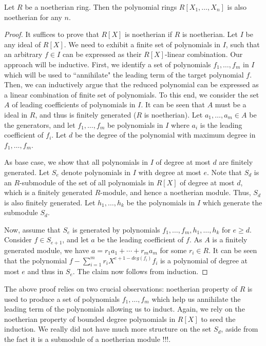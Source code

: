 \documentclass[11pt]{article}
\begin{document}
\begin{theorem}\label{thm:hilbert-basis-theorem}
Let $R$ be a noetherian ring. Then the polynomial rings $R[X_1,\ldots,X_n]$ is also noetherian for any $n$.
\end{theorem}
\begin{proof}
It suffices to prove that $R[X]$ is noetherian if $R$ is noetherian. Let $I$ be any ideal of $R[X]$. We need to
exhibit a finite set of polynomials in $I$, such that an arbitrary $f\in I$ can be expressed as their $R[X]$-linear
combination. Our approach will be inductive. First, we identify a set of polynomials $f_1,\ldots,f_m$ in $I$
which will be used to ``annihilate" the leading term of the target polynomial $f$. Then, we can inductively argue
that the reduced polynomial can be expressed as a linear combination of finite set of polynomials. To this end,
we consider the set $A$ of leading coefficients of polynomials in $I$. It can be seen that $A$ must be a ideal
in $R$, and thus is finitely generated ($R$ is noetherian). Let $a_1,\ldots,a_m\in A$ be the generators, and
let $f_1,\ldots,f_m$ be polynomials in $I$ where $a_i$ is the leading coefficient of $f_i$. Let $d$ be the
degree of the polynomial with maximum degree in $f_1,\ldots,f_m$.

As base case, we show that all polynomials in $I$ of degree at most $d$ are finitely generated. Let $S_e$ denote
polynomials in $I$ with degree at most $e$. Note that $S_d$ is an $R$-submodule of the set of all polynomials
in $R[X]$ of degree at most $d$, which is a finitely generated $R$-module, and hence a noetherian module. Thus,
$S_d$ is also finitely generated. Let $h_1,\ldots,h_k$ be the polynomials in $I$ which generate the submodule
$S_d$.

Now, assume that $S_e$ is generated by polynomials $f_1,\ldots,f_m,h_1,\ldots,h_k$ for $e\geq d$. Consider
$f\in S_{e+1}$, and let $a$ be the leading coefficient of $f$. As $A$ is a finitely generated module, we
have $a=r_1 a_1 + \cdots + r_m a_m$ for some $r_i\in R$. It can be seen that the polynomial
$f - \sum_{i=1}^m r_i X^{e+1-deg(f_i)}f_i$ is a polynomial of degree at most $e$ and thus in $S_e$. The claim
now follows from induction.
\end{proof}

The above proof relies on two crucial observations: noetherian property of $R$ is used
to produce a set of polynomials $f_1,\ldots, f_m$ which help us annihilate the leading term of the polynomials
allowing us to induct. Again, we rely on the noetherian property of bounded degree polynomials in $R[X]$ to seed
the induction. We really did not have much more structure on the set $S_d$, aside from the fact it is a submodule
of a noetherian module !!!.
\end{document}
